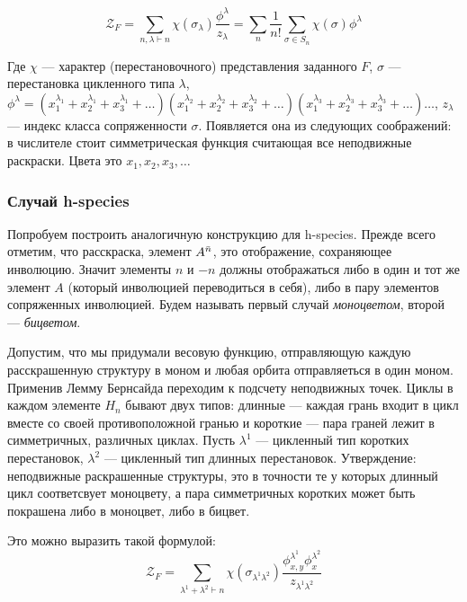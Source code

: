\begin{equation}
\label{eq:fr}
\mathcal Z_F = \sum_{n, \lambda \vdash n}\chi(\sigma_{\lambda})
\frac{\phi^{\lambda}}{z_{\lambda}} =
\sum_{n}\frac{1}{n!}\sum_{\sigma \in S_n}\chi(\sigma)\phi^{\lambda}
\end{equation}

Где $\chi$ --- характер (перестановочного) представления заданного $F$, $\sigma$
--- перестановка цикленного типа $\lambda$, 
$\phi^{\lambda} = 
(x_1^{\lambda_1} + x_2^{\lambda_1} + x_3^{\lambda_1} + \dots)
(x_1^{\lambda_2} + x_2^{\lambda_2} + x_3^{\lambda_2} + \dots)
(x_1^{\lambda_3} + x_2^{\lambda_3} + x_3^{\lambda_3} + \dots)
\dots$,
 $z_\lambda$ --- индекс класса сопряженности $\sigma$.
Появляется она из следующих соображений: в числителе стоит симметрическая
функция считающая все неподвижные раскраски. Цвета это $x_1, x_2, x_3, \dots$

\subsubsection{Случай h-species}
Попробуем построить аналогичную конструкцию для h-species.
Прежде всего отметим, что расскраска, элемент $A^{\Bar n}$, это отображение,
сохраняющее инволюцию. Значит элементы $n$ и $-n$ должны отображаться либо в
один и тот же элемент $A$ (который инволюцией переводиться в себя), либо в пару
элементов сопряженных инволюцией. Будем называть первый случай
\emph{моноцветом}, второй --- \emph{бицветом}.	

Допустим, что мы придумали весовую функцию, отправляющую каждую расскрашенную
структуру в моном и любая орбита отправляеться в один моном. Применив Лемму
Бернсайда переходим к подсчету неподвижных точек. Циклы в каждом элементе $H_n$
бывают двух типов:
длинные --- каждая грань входит в цикл вместе со своей противоположной гранью и
короткие --- пара граней лежит в симметричных, различных циклах. Пусть
$\lambda^1$ --- цикленный тип коротких перестановок, $\lambda^2$ --- цикленный
тип длинных перестановок. Утверждение: неподвижные
раскрашенные структуры, это в точности те у которых длинный цикл соответсвует
моноцвету, а пара симметричных коротких может быть покрашена либо в моноцвет, либо в бицвет.

Это можно выразить такой формулой:
\begin{equation}
\label{eq:h-fr}
\mathcal Z_F = \sum_{\lambda^1 + \lambda^2 \vdash n}\chi(\sigma_{\lambda^1
\lambda^2})
\frac{\phi_{x, y}^{\lambda^1} \phi_{x}^{\lambda^2}}{z_{\lambda^1 \lambda^2}}
\end{equation}

